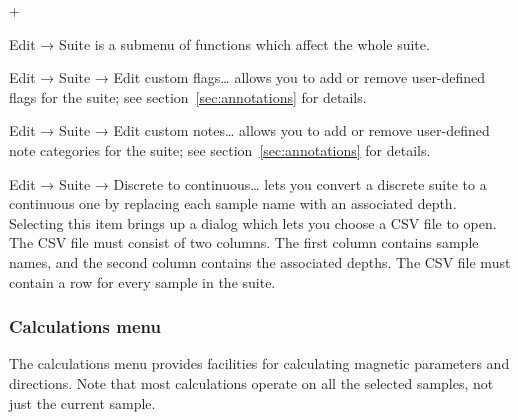 \documentclass[a4paper,british]{article}
\newcommand{\menuitemlabel}[1]{%
\mbox{\textsf{#1}}\hfil}
\newenvironment{menuitemlist}%
{\begin{list}{}{%
\renewcommand{\makelabel}{\menuitemlabel}%
\setlength{\labelwidth}{35pt}%
\setlength{\leftmargin}%
             {\labelwidth+\labelsep}}}%
{\end{list}}
\newcommand{\submenu}{ \textrm{→} }
\begin{document}
\begin{menuitemlist}
\item[Edit\submenu Suite] is a submenu of functions which affect the whole
  suite.
  
\item[Edit\submenu Suite\submenu Edit custom flags\ldots] allows you to
  add or remove user-defined flags for the suite; see
  section~\ref{sec:annotations} for details.

\item[Edit\submenu Suite\submenu Edit custom notes\ldots] allows you to
  add or remove user-defined note categories for the suite; see
  section~\ref{sec:annotations} for details.

\item[Edit\submenu Suite\submenu Discrete to continuous\ldots] lets you
  convert a discrete suite to a continuous one by replacing each sample
  name with an associated depth. Selecting this item brings up a dialog
  which lets you choose a CSV file to open. The CSV file must consist of
  two columns. The first column contains sample names, and the second
  column contains the associated depths. The CSV file must contain a row
  for every sample in the suite.

\end{menuitemlist}

\subsubsection{\label{sec:functions-calcs}Calculations menu}

The calculations menu provides facilities for calculating magnetic
parameters and directions. Note that most calculations operate on
all the selected samples, not just the current sample.
\end{document}
